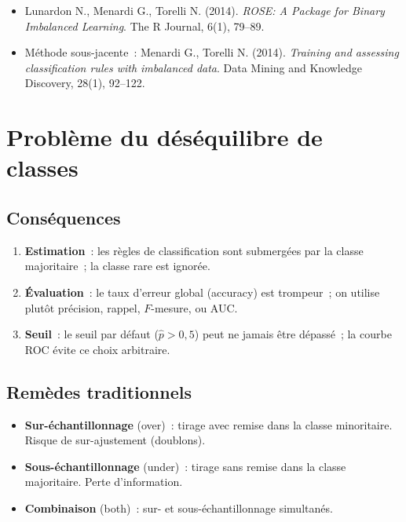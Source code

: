 \documentclass[a4paper,11pt]{article}
\theoremstyle{definition}
\begin{document}
\begin{itemize}
  \item Lunardon N., Menardi G., Torelli N. (2014).
    \emph{ROSE: A Package for Binary Imbalanced Learning}.
    The R Journal, 6(1), 79--89.
  \item M\'ethode sous-jacente~: Menardi G., Torelli N. (2014).
    \emph{Training and assessing classification rules with imbalanced
    data}. Data Mining and Knowledge Discovery, 28(1), 92--122.
\end{itemize}

\section{Probl\`eme du d\'es\'equilibre de classes}

\subsection{Cons\'equences}

\begin{enumerate}
  \item \textbf{Estimation}~: les r\`egles de classification sont
    \guillemotleft submerg\'ees \guillemotright par la classe
    majoritaire~; la classe rare est ignor\'ee.
  \item \textbf{\'Evaluation}~: le taux d'erreur global (accuracy)
    est trompeur~; on utilise plut\^ot pr\'ecision, rappel,
    $F$-mesure, ou AUC.
  \item \textbf{Seuil}~: le seuil par d\'efaut ($\hat{p} > 0,5$)
    peut ne jamais \^etre d\'epass\'e~; la courbe ROC \'evite ce
    choix arbitraire.
\end{enumerate}

\subsection{Rem\`edes traditionnels}

\begin{itemize}
  \item \textbf{Sur-\'echantillonnage} (over)~: tirage avec remise
    dans la classe minoritaire. Risque de sur-ajustement (doublons).
  \item \textbf{Sous-\'echantillonnage} (under)~: tirage sans remise
    dans la classe majoritaire. Perte d'information.
  \item \textbf{Combinaison} (both)~: sur- et sous-\'echantillonnage
    simultan\'es.
\end{itemize}
\end{document}
